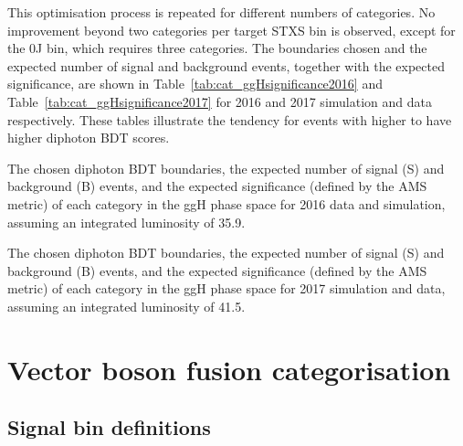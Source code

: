This optimisation process is repeated for different numbers of categories.
No improvement beyond two categories per target STXS bin is observed, 
except for the 0J bin, which requires three categories.
The boundaries chosen and the expected number of signal and background events, 
together with the expected significance, 
are shown in Table~\ref{tab:cat_ggHsignificance2016} and Table~\ref{tab:cat_ggHsignificance2017} 
for 2016 and 2017 simulation and data respectively.
These tables illustrate the tendency for events with higher \ptH to have higher diphoton BDT scores.

\begin{table}
  \begin{centering}
    
    \caption[Definitions of 2016 categories targeting ggH production.]
    {
      The chosen diphoton BDT boundaries, 
      the expected number of signal (S) and background (B) events, 
      and the expected significance (defined by the AMS metric) of each category in the ggH phase space 
      for 2016 data and simulation, assuming an integrated luminosity of \SI{35.9}{\fbinv}.
    }
    \label{tab:cat_ggHsignificance2016}
  \end{centering}
\end{table}

\begin{table}
  \begin{centering}
    
    \caption[Definitions of 2017 categories targeting ggH production.]
    {
      The chosen diphoton BDT boundaries, 
      the expected number of signal (S) and background (B) events, 
      and the expected significance (defined by the AMS metric) of each category in the ggH phase space 
      for 2017 simulation and data, assuming an integrated luminosity of \SI{41.5}{\fbinv}.
    }
    \label{tab:cat_ggHsignificance2017}
  \end{centering}
\end{table}

\clearpage

\section{Vector boson fusion categorisation}
\subsection{Signal bin definitions}


